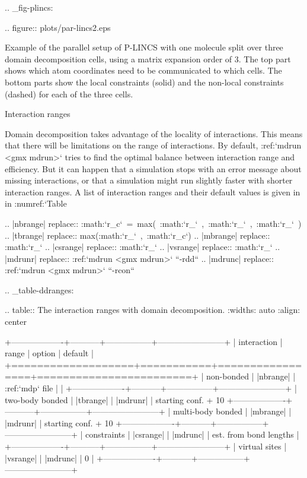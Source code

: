 {.. _fig-plincs:

.. figure:: plots/par-lincs2.eps

   Example of the parallel setup of P-LINCS with one molecule
   split over three domain decomposition cells, using a matrix expansion
   order of 3. The top part shows which atom coordinates need to be
   communicated to which cells. The bottom parts show the local
   constraints (solid) and the non-local constraints (dashed) for each
   of the three cells.

Interaction ranges
~~~~~~~~~~~~~~~~~~

Domain decomposition takes advantage of the locality of interactions.
This means that there will be limitations on the range of interactions.
By default, :ref:`mdrun <gmx mdrun>` tries to find the optimal balance
between interaction range and efficiency. But it can happen that a
simulation stops with an error message about missing interactions, or
that a simulation might run slightly faster with shorter interaction
ranges. A list of interaction ranges and their default values is given
in in :numref:`Table %

.. |nbrange| replace:: :math:`r_c`\ =\ max(\ :math:`r_{}`\ ,\ :math:`r_{}`\ ,\ :math:`r_{}`\ )
.. |tbrange| replace:: max(:math:`r_{}`\ ,\ :math:`r_c`) 
.. |mbrange| replace:: :math:`r_{}` 
.. |csrange| replace:: :math:`r_{}`
.. |vsrange| replace:: :math:`r_{}` 
.. |mdrunr| replace:: :ref:`mdrun <gmx mdrun>` ``-rdd``
.. |mdrunc| replace:: :ref:`mdrun <gmx mdrun>` ``-rcon``

.. _table-ddranges:

.. table:: The interaction ranges with domain decomposition.
    :widths: auto
    :align: center

    +-------------------+-----------+-----------------+------------------------+
    | interaction       | range     | option          | default                |
    +===================+===========+=================+========================+
    | non-bonded        | |nbrange| | :ref:`mdp` file |                        |
    +-------------------+-----------+-----------------+------------------------+
    | two-body bonded   | |tbrange| | |mdrunr|        | starting conf. + 10%
    +-------------------+-----------+-----------------+------------------------+
    | multi-body bonded | |mbrange| | |mdrunr|        | starting conf. + 10%
    +-------------------+-----------+-----------------+------------------------+
    | constraints       | |csrange| | |mdrunc|        | est. from bond lengths |
    +-------------------+-----------+-----------------+------------------------+
    | virtual sites     | |vsrange| | |mdrunc|        | 0                      |
    +-------------------+-----------+-----------------+------------------------+


}
